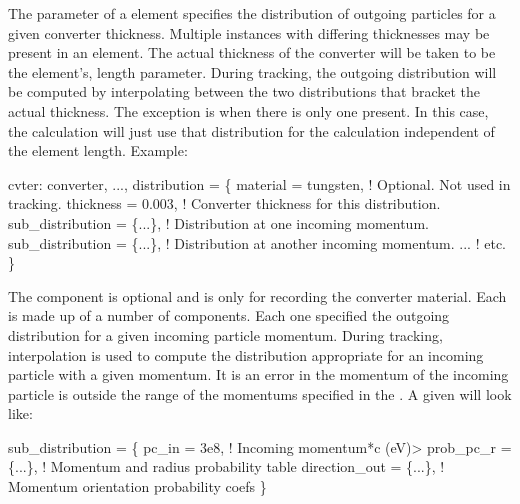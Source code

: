 The  parameter of a  element specifies the distribution of outgoing
particles for a given converter thickness. Multiple  instances with differing
thicknesses may be present in an element. The actual thickness of the converter will be taken to be
the element's, length  parameter. During tracking, the outgoing distribution will be computed
by interpolating between the two distributions that bracket the actual thickness. The exception is
when there is only one present. In this case, the calculation will just use that
distribution for the calculation independent of the element length. Example:
\begin{example}
cvter: converter, ..., distribution = \{
    material = tungsten,      ! Optional. Not used in tracking.
    thickness = 0.003,        ! Converter thickness for this distribution.
    sub_distribution = \{...\}, ! Distribution at one incoming momentum.
    sub_distribution = \{...\}, ! Distribution at another incoming momentum.
    ...                       ! etc.
  \}
\end{example}
The  component is optional and is only for recording the converter material. Each
 is made up of a number of  components. Each one specified the
outgoing distribution for a given incoming particle momentum. During tracking, interpolation is used
to compute the distribution appropriate for an incoming particle with a given momentum. It is an
error in the momentum of the incoming particle is outside the range of the momentums specified
in the . A given  will look like:
\begin{example}
  sub_distribution = \{
    pc_in = 3e8,            ! Incoming momentum*c (eV)>
    prob_pc_r = \{...\},      ! Momentum and radius probability table 
    direction_out = \{...\},  ! Momentum orientation probability coefs
  \}
\end{example}

